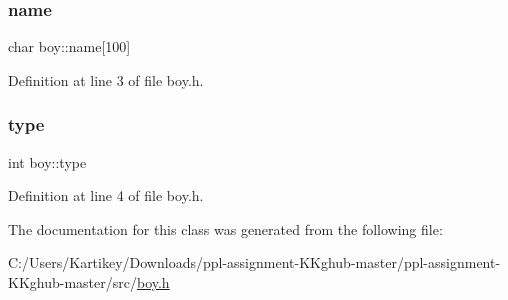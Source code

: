 \subsubsection{\texorpdfstring{name}{name}}
{\footnotesize\ttfamily char boy\+::name\mbox{[}100\mbox{]}}



Definition at line 3 of file boy.\+h.

\mbox{\label{classboy_a53f19b290e6f6930623ca571a7d38e18}} 
\subsubsection{\texorpdfstring{type}{type}}
{\footnotesize\ttfamily int boy\+::type}



Definition at line 4 of file boy.\+h.



The documentation for this class was generated from the following file\+:\begin{DoxyCompactItemize}
\item 
C\+:/\+Users/\+Kartikey/\+Downloads/ppl-\/assignment-\/\+K\+Kghub-\/master/ppl-\/assignment-\/\+K\+Kghub-\/master/src/\hyperlink{boy_8h}{boy.\+h}\end{DoxyCompactItemize}
